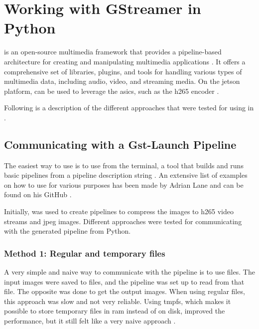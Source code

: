 
\section{Working with GStreamer in Python}
\gs is an open-source multimedia framework that provides a pipeline-based architecture for creating and manipulating multimedia applications \cite{gstreamerGStreamerOpenSource}.
It offers a comprehensive set of libraries, plugins, and tools for handling various types of multimedia data, including audio, video, and streaming media.
On the \gls{jetson} platform, \gs can be used to leverage the \glspl{asic}, such as the \gls{h265} encoder \cite{nvidiaAcceleratedGStreamerJetson}.

Following is a description of the different approaches that were tested for using \gs in \py.


\subsection{Communicating with a Gst-Launch Pipeline}
The easiest way to use \gs is to use  from the terminal, a tool that builds and runs basic \gs pipelines from a pipeline description string \cite{Gstlaunch1}.
An extensive list of examples on how to use  for various purposes has been made by Adrian Lane and can be found on his GitHub \cite{laneGStreamerPipelineSamples2020}.

Initially,  was used to create pipelines to compress the images to \gls{h265} video streams and \gls{jpeg} images.
Different approaches were tested for communicating with the generated pipeline from Python.

\subsubsection{Method 1: Regular and temporary files}
A very simple and naive way to communicate with the pipeline is to use files.
The input images were saved to files, and the pipeline was set up to read from that file.
The opposite was done to get the output images.
When using regular files, this approach was slow and not very reliable.
Using \gls{tmpfs}, which makes it possible to store temporary files in \gls{ram} instead of on disk, improved the performance, but it still felt like a very naive approach \cite{dickinsTmpfsLinuxKernel2010}.

